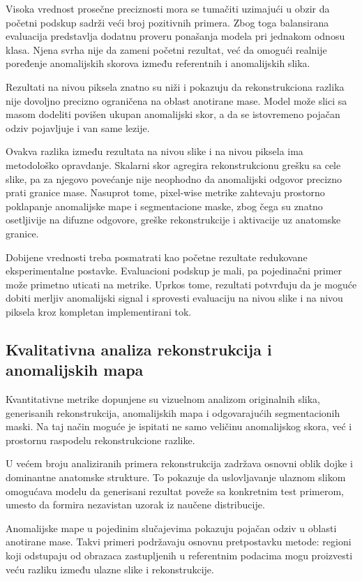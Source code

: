 \documentclass[10pt]{article}
\begin{document}
	Visoka vrednost prosečne preciznosti mora se tumačiti uzimajući u obzir da početni podskup sadrži veći broj pozitivnih primera. Zbog toga balansirana evaluacija predstavlja dodatnu proveru ponašanja modela pri jednakom odnosu klasa. Njena svrha nije da zameni početni rezultat, već da omogući realnije poređenje anomalijskih skorova između referentnih i anomalijskih slika.
	
	Rezultati na nivou piksela znatno su niži i pokazuju da rekonstrukciona razlika nije dovoljno precizno ograničena na oblast anotirane mase. Model može slici sa masom dodeliti povišen ukupan anomalijski skor, a da se istovremeno pojačan odziv pojavljuje i van same lezije.
	
	Ovakva razlika između rezultata na nivou slike i na nivou piksela ima metodološko opravdanje. Skalarni skor agregira rekonstrukcionu grešku sa cele slike, pa za njegovo povećanje nije neophodno da anomalijski odgovor precizno prati granice mase. Nasuprot tome, pixel-wise metrike zahtevaju prostorno poklapanje anomalijske mape i segmentacione maske, zbog čega su znatno osetljivije na difuzne odgovore, greške rekonstrukcije i aktivacije uz anatomske granice.
	
	Dobijene vrednosti treba posmatrati kao početne rezultate redukovane eksperimentalne postavke. Evaluacioni podskup je mali, pa pojedinačni primer može primetno uticati na metrike. Uprkos tome, rezultati potvrđuju da je moguće dobiti merljiv anomalijski signal i sprovesti evaluaciju na nivou slike i na nivou piksela kroz kompletan implementirani tok.
	
	\subsection{Kvalitativna analiza rekonstrukcija i anomalijskih mapa}
	
	Kvantitativne metrike dopunjene su vizuelnom analizom originalnih slika, generisanih rekonstrukcija, anomalijskih mapa i odgovarajućih segmentacionih maski. Na taj način moguće je ispitati ne samo veličinu anomalijskog skora, već i prostornu raspodelu rekonstrukcione razlike.
	
	U većem broju analiziranih primera rekonstrukcija zadržava osnovni oblik dojke i dominantne anatomske strukture. To pokazuje da uslovljavanje ulaznom slikom omogućava modelu da generisani rezultat poveže sa konkretnim test primerom, umesto da formira nezavistan uzorak iz naučene distribucije.
	
	Anomalijske mape u pojedinim slučajevima pokazuju pojačan odziv u oblasti anotirane mase. Takvi primeri podržavaju osnovnu pretpostavku metode: regioni koji odstupaju od obrazaca zastupljenih u referentnim podacima mogu proizvesti veću razliku između ulazne slike i rekonstrukcije.
	
\end{document}
